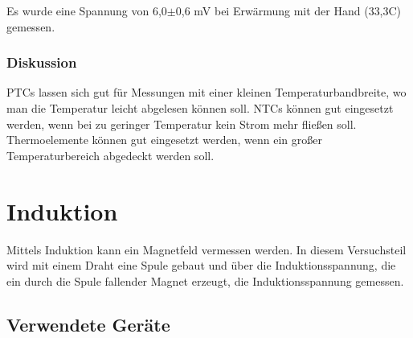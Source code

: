 \documentclass[12pt,a4paper]{article}
\begin{document}
Es wurde eine Spannung von 6,0$\pm$0,6 mV bei Erwärmung mit der Hand (33,3C) gemessen.

\subsubsection*{Diskussion}

PTCs lassen sich gut für Messungen mit einer kleinen Temperaturbandbreite, wo man die Temperatur leicht abgelesen können soll. NTCs können gut eingesetzt werden, wenn bei zu geringer Temperatur kein Strom mehr fließen soll. Thermoelemente können gut eingesetzt werden, wenn ein großer Temperaturbereich abgedeckt werden soll. 









\section{Induktion}

Mittels Induktion kann ein Magnetfeld vermessen werden. In diesem Versuchsteil wird mit einem Draht eine Spule gebaut und über die Induktionsspannung, die ein durch die Spule fallender Magnet erzeugt, die Induktionsspannung gemessen.

\subsection*{Verwendete Geräte}
\end{document}
